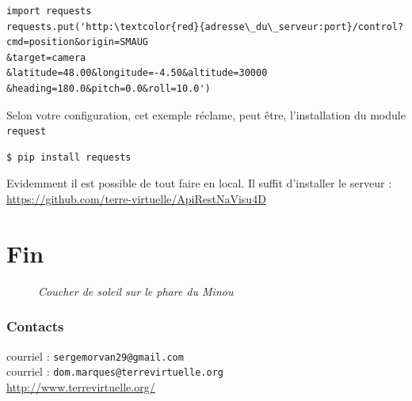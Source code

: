 \begin{Verbatim}[commandchars=\\\{\}]
import requests
requests.put('http:\textcolor{red}{adresse\_du\_serveur:port}/control?cmd=position&origin=SMAUG
&target=camera
&latitude=48.00&longitude=-4.50&altitude=30000
&heading=180.0&pitch=0.0&roll=10.0')
\end{Verbatim}

Selon votre configuration, cet exemple réclame, peut être, l'installation du module {\tt request}
\begin{verbatim}
$ pip install requests
\end{verbatim}
Evidemment il est possible  de tout faire en local. Il suffit d'installer le serveur :\\
 \textcolor{blue}{\href{https://github.com/terre-virtuelle/ApiRestNaVisu4D}{https://github.com/terre-virtuelle/ApiRestNaVisu4D}}
 


\chapter*{Fin}
\begin{center}
\begin{figure}[ht]
\caption{\label{equiProj}\textit{Coucher de soleil sur le phare du Minou}}
\end{figure}
\end{center}
\subsection*{Contacts}
courriel : {\tt sergemorvan29@gmail.com}\\
\hbox{}\hspace{0.6cm}courriel : {\tt dom.marques@terrevirtuelle.org}\\
 \hbox{}\hspace{6cm}\href{http://www.terrevirtuelle.org/}{http://www.terrevirtuelle.org/}


